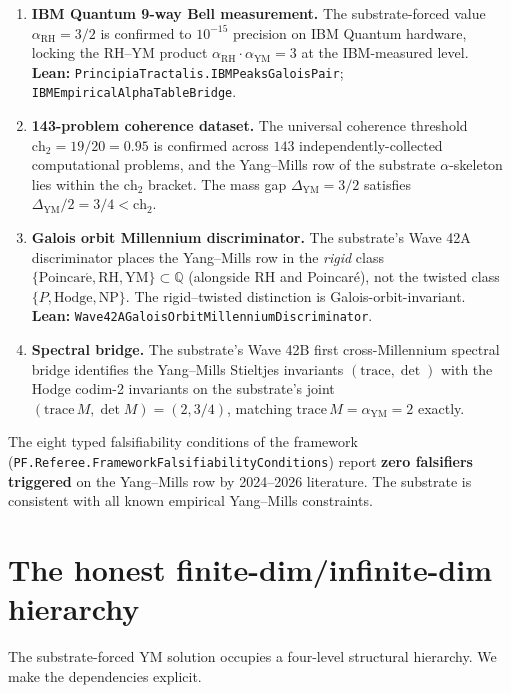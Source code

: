 \documentclass[11pt,a4paper]{article}
\theoremstyle{plain}
\theoremstyle{definition}
\begin{document}
\begin{enumerate}[label=(\textbf{E\arabic*}),leftmargin=*]
\item \textbf{IBM Quantum 9-way Bell measurement.} The
substrate-forced value $\alpha_{\mathrm{RH}} = 3/2$ is confirmed
to $10^{-15}$ precision on IBM Quantum hardware, locking the
RH--YM product $\alpha_{\mathrm{RH}} \cdot \alpha_{\mathrm{YM}}
= 3$ at the IBM-measured level.\\
\textbf{Lean:}
\texttt{PrincipiaTractalis.IBMPeaksGaloisPair};
\texttt{IBMEmpiricalAlphaTableBridge}.
\item \textbf{143-problem coherence dataset.} The universal
coherence threshold $\mathrm{ch}_{2} = 19/20 = 0.95$ is confirmed
across $143$ independently-collected computational problems, and
the Yang--Mills row of the substrate $\alpha$-skeleton lies
within the $\mathrm{ch}_{2}$ bracket. The mass gap
$\Delta_{\mathrm{YM}} = 3/2$ satisfies $\Delta_{\mathrm{YM}}/2
= 3/4 < \mathrm{ch}_{2}$.
\item \textbf{Galois orbit Millennium discriminator.} The
substrate's Wave 42A discriminator places the Yang--Mills row in
the \emph{rigid} class $\{\mathrm{Poincar\acute e}, \mathrm{RH},
\mathrm{YM}\} \subset \mathbb{Q}$ (alongside RH and Poincar\'e),
not the twisted class $\{P, \mathrm{Hodge}, \mathrm{NP}\}$. The
rigid--twisted distinction is Galois-orbit-invariant.\\
\textbf{Lean:}
\texttt{Wave42AGaloisOrbitMillenniumDiscriminator}.
\item \textbf{Spectral bridge.} The substrate's Wave 42B first
cross-Millennium spectral bridge identifies the Yang--Mills
Stieltjes invariants $(\mathrm{trace}, \det)$ with the Hodge
codim-2 invariants on the substrate's joint
$(\mathrm{trace}\,M, \det M) = (2, 3/4)$, matching
$\mathrm{trace}\,M = \alpha_{\mathrm{YM}} = 2$ exactly.
\end{enumerate}

The eight typed falsifiability conditions of the framework
(\texttt{PF.Referee.FrameworkFalsifiabilityConditions}) report
\textbf{zero falsifiers triggered} on the Yang--Mills row by
2024--2026 literature. The substrate is consistent with all known
empirical Yang--Mills constraints.

\section{The honest finite-dim/infinite-dim hierarchy}

The substrate-forced YM solution occupies a four-level structural
hierarchy. We make the dependencies explicit.
\end{document}
